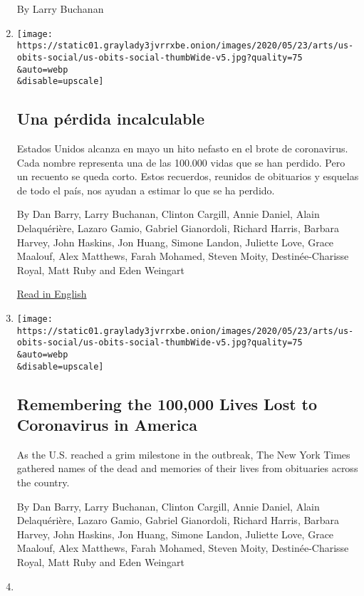 \begin{enumerate}
  By Larry Buchanan
\item
  \href{/es/2020/05/26/espanol/mundo/100000-victimas-covid-estados-unidos.html}{}

  \texttt{[image: https://static01.graylady3jvrrxbe.onion/images/2020/05/23/arts/us-obits-social/us-obits-social-thumbWide-v5.jpg?quality=75\\\&auto=webp\\\&disable=upscale]}

  \hypertarget{una-puxe9rdida-incalculable}{%
  \subsection{Una pérdida
  incalculable}\label{una-puxe9rdida-incalculable}}

  Estados Unidos alcanza en mayo un hito nefasto en el brote de
  coronavirus. Cada nombre representa una de las 100.000 vidas que se
  han perdido. Pero un recuento se queda corto. Estos recuerdos,
  reunidos de obituarios y esquelas de todo el país, nos ayudan a
  estimar lo que se ha perdido.

  By Dan Barry, Larry Buchanan, Clinton Cargill, Annie Daniel, Alain
  Delaquérière, Lazaro Gamio, Gabriel Gianordoli, Richard Harris,
  Barbara Harvey, John Haskins, Jon Huang, Simone Landon, Juliette Love,
  Grace Maalouf, Alex Matthews, Farah Mohamed, Steven Moity,
  Destinée-Charisse Royal, Matt Ruby and Eden Weingart

  \href{https://www.nytimes3xbfgragh.onion/interactive/2020/05/24/us/us-coronavirus-deaths-100000.html}{Read
  in English}
\item
  \href{/interactive/2020/05/24/us/us-coronavirus-deaths-100000.html}{}

  \texttt{[image: https://static01.graylady3jvrrxbe.onion/images/2020/05/23/arts/us-obits-social/us-obits-social-thumbWide-v5.jpg?quality=75\\\&auto=webp\\\&disable=upscale]}

  \hypertarget{remembering-the-100000-lives-lost-to-coronavirus-in-america}{%
  \subsection{Remembering the 100,000 Lives Lost to Coronavirus in
  America}\label{remembering-the-100000-lives-lost-to-coronavirus-in-america}}

  As the U.S. reached a grim milestone in the outbreak, The New York
  Times gathered names of the dead and memories of their lives from
  obituaries across the country.

  By Dan Barry, Larry Buchanan, Clinton Cargill, Annie Daniel, Alain
  Delaquérière, Lazaro Gamio, Gabriel Gianordoli, Richard Harris,
  Barbara Harvey, John Haskins, Jon Huang, Simone Landon, Juliette Love,
  Grace Maalouf, Alex Matthews, Farah Mohamed, Steven Moity,
  Destinée-Charisse Royal, Matt Ruby and Eden Weingart
\item
  \href{/interactive/2020/05/08/health/coronavirus-covid-lungs-ventilators.html}{}


\end{enumerate}
